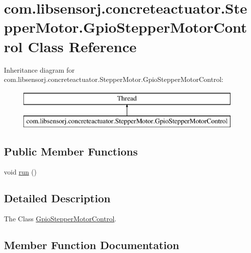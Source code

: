 \hypertarget{classcom_1_1libsensorj_1_1concreteactuator_1_1StepperMotor_1_1GpioStepperMotorControl}{}\section{com.\+libsensorj.\+concreteactuator.\+Stepper\+Motor.\+Gpio\+Stepper\+Motor\+Control Class Reference}
\label{classcom_1_1libsensorj_1_1concreteactuator_1_1StepperMotor_1_1GpioStepperMotorControl}
Inheritance diagram for com.\+libsensorj.\+concreteactuator.\+Stepper\+Motor.\+Gpio\+Stepper\+Motor\+Control\+:\begin{figure}[H]
\begin{center}
\leavevmode
\includegraphics[height=2.000000cm]{classcom_1_1libsensorj_1_1concreteactuator_1_1StepperMotor_1_1GpioStepperMotorControl}
\end{center}
\end{figure}
\subsection*{Public Member Functions}
\begin{DoxyCompactItemize}
\item 
void \hyperlink{classcom_1_1libsensorj_1_1concreteactuator_1_1StepperMotor_1_1GpioStepperMotorControl_a04919aace52a0f604ecba747b231bbd0}{run} ()
\end{DoxyCompactItemize}


\subsection{Detailed Description}
The Class \hyperlink{classcom_1_1libsensorj_1_1concreteactuator_1_1StepperMotor_1_1GpioStepperMotorControl}{Gpio\+Stepper\+Motor\+Control}. 

\subsection{Member Function Documentation}
\hypertarget{classcom_1_1libsensorj_1_1concreteactuator_1_1StepperMotor_1_1GpioStepperMotorControl_a04919aace52a0f604ecba747b231bbd0}{}
